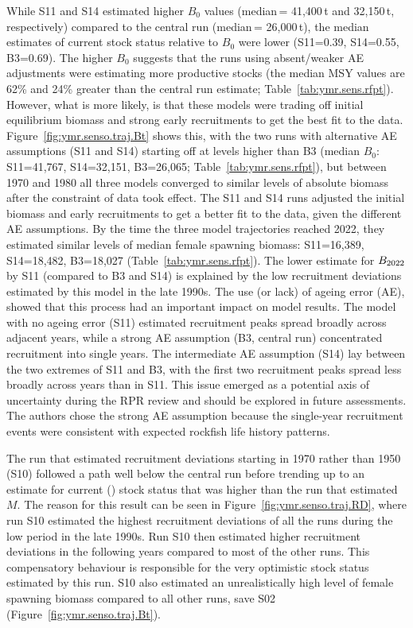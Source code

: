 \documentclass[11pt]{book}
\newcommand{\pc}{\%}
\begin{document}
While S11 and S14 estimated higher $B_0$ values (median\,= 41,400\,t and 32,150\,t, respectively) compared to the central run (median\,= 26,000\,t), the median estimates of current stock status relative to $B_0$ were lower (S11=0.39, S14=0.55, B3=0.69).
The higher $B_0$ suggests that the runs using absent/weaker AE adjustments were estimating more productive stocks (the median MSY values are 62\pc{} and 24\pc{} greater than the central run estimate; Table~\ref{tab:ymr.sens.rfpt}).
However, what is more likely, is that these models were trading off initial equilibrium biomass and strong early recruitments to get the best fit to the data.
Figure~\ref{fig:ymr.senso.traj.Bt} shows this, with the two runs with alternative AE assumptions (S11 and S14) starting off at levels higher than B3 (median $B_0$: S11=41,767, S14=32,151, B3=26,065; Table~\ref{tab:ymr.sens.rfpt}), but between 1970 and 1980 all three models converged to similar levels of absolute biomass after the constraint of data took effect.
The S11 and S14 runs adjusted the initial biomass and early recruitments to get a better fit to the data, given the different AE assumptions.
By the time the three model trajectories reached 2022, they estimated similar levels of median female spawning biomass: S11=16,389, S14=18,482, B3=18,027 (Table~\ref{tab:ymr.sens.rfpt}).
The lower estimate for $B_{2022}$ by S11 (compared to B3 and S14) is explained by the low recruitment deviations estimated by this model in the late 1990s.
The use (or lack) of ageing error (AE), showed that this process had an important impact on model results.
The model with no ageing error (S11) estimated recruitment peaks spread broadly across adjacent years, while a strong AE assumption (B3, central run) concentrated recruitment into single years.
The intermediate AE assumption (S14) lay between the two extremes of S11 and B3, with the first two recruitment peaks spread less broadly across years than in S11.
This issue emerged as a potential axis of uncertainty during the RPR review and should be explored in future assessments.
The authors chose the strong AE assumption because the single-year recruitment events were consistent with expected rockfish life history patterns. 

The run that estimated recruitment deviations starting in 1970 rather than 1950 (S10) followed a path well below the central run before trending up to an estimate for current (\currYear) stock status that was higher than the run that estimated $M$.
The reason for this result can be seen in Figure~\ref{fig:ymr.senso.traj.RD}, where run S10 estimated the highest recruitment deviations of all the runs during the low period in the late 1990s.
Run S10 then estimated higher recruitment deviations in the following years compared to most of the other runs.
This compensatory behaviour is responsible for the very optimistic stock status estimated by this run.
S10 also estimated an unrealistically high level of female spawning biomass compared to all other runs, save S02 (Figure~\ref{fig:ymr.senso.traj.Bt}).
\end{document}
